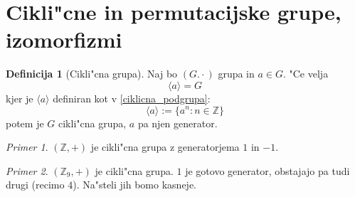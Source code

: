 \documentclass[11pt, a4paper]{article}
\theoremstyle{definition}
\newtheorem{defn}[counter]{Definicija}
\theoremstyle{remark}
\newtheorem*{ex}{Primer}
\newcommand{\Z}{\mathbb{Z}}
\begin{document}
	\section{Cikli"cne in permutacijske grupe, izomorfizmi}
	\begin{defn}[Cikli"cna grupa]
		Naj bo $(G. \cdot)$ grupa in $a \in G$. "Ce velja 
		\[ \langle a \rangle = G \]
		kjer je $ \langle a \rangle $ definiran kot v \ref{ciklicna_podgrupa}:
		\[ \langle a \rangle := \lbrace a^n: n \in \Z \rbrace \]
		potem je $G$ cikli"cna grupa, $a$ pa njen generator.
	\end{defn}
	
	\begin{ex}
		$(\Z, +)$ je cikli"cna grupa z generatorjema $1$ in $-1$.
	\end{ex}

	\begin{ex}
		$(\Z_9, +)$ je cikli"cna grupa. $1$ je gotovo generator, obstajajo pa tudi drugi (recimo $4$). Na"steli jih bomo kasneje.
	\end{ex}
\end{document}
